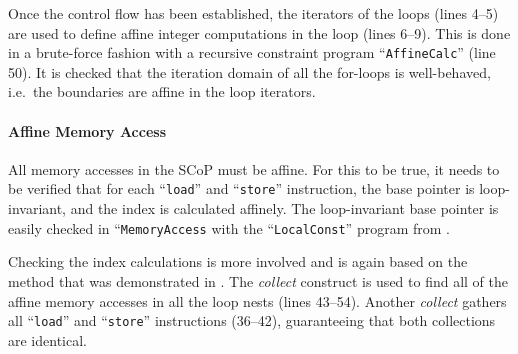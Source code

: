     Once the control flow has been established, the iterators of the loops
    (lines 4--5) are used to define affine integer computations in the loop
    (lines 6--9).
    This is done in a brute-force fashion with a recursive constraint program
    ``{\tt AffineCalc}'' (line 50).
    It is checked that the iteration domain of all the for-loops is
    well-behaved, i.e.\ the boundaries are affine in the loop iterators.

    \paragraph*{Affine Memory Access}
    All memory accesses in the SCoP must be affine.
    For this to be true, it needs to be verified that for each ``{\tt load}''
    and ``{\tt store}'' instruction, the base pointer is loop-invariant, and the
    index is calculated affinely.
    The loop-invariant base pointer is easily checked in ``{\tt MemoryAccess}
    with the ``\texttt{LocalConst}'' program from .

    Checking the index calculations is more involved and is again based on the
    method that was demonstrated in .
    The {\it collect} construct is used to find all of the affine memory
    accesses in all the loop nests (lines 43--54).
    Another {\it collect} gathers all ``\texttt{load}'' and ``\texttt{store}''
    instructions (36--42), guaranteeing that both collections are identical.

